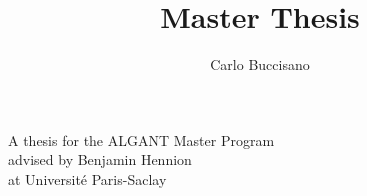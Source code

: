 \documentclass[a4paper, 10pt, titlepage, oneside]{book}
\author{Carlo Buccisano}
\title{Master Thesis}
\begin{document}
    \frontmatter
    

    \newpage
    \begin{center}
        
        \Large{A thesis for the ALGANT Master Program \\
        advised by Benjamin Hennion \\
        at Université Paris-Saclay}
    \end{center}

        
        
    \clearpage

    \tableofcontents
    

    \mainmatter
    
    
    
    
    
    \backmatter
    \printbibliography[heading=bibintoc]
\end{document}
